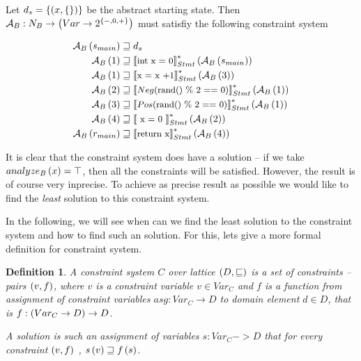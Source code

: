 \documentclass[..thesis.tex]{subfiles}
\newtheorem{defin}{Definition}[section]
\begin{document}
Let $d_s = \left\lbrace \left( x, \left\lbrace \right\rbrace \right) \right\rbrace $ be the abstract starting state. Then $\mathcal{A}_B : N_B \to \left( Var \to 2^{ \left\lbrace -, 0, + \right\rbrace } \right) $ must satisfiy the following constraint system

\begin{equation*}
  \begin{split}
    \mathcal{A}_B \left( s_{main} \right) & \sqsupseteq d_s \\
    \mathcal{A}_B \left( 1 \right) & \sqsupseteq \left\llbracket \text{\small{int x = 0}} \right\rrbracket_{Stmt}^{*} \left( \mathcal{A}_B \left( s_{main} \right) \right) \\
    \mathcal{A}_B \left( 1 \right) & \sqsupseteq \left\llbracket \text{\small{x = x +1}}  \right\rrbracket_{Stmt}^{*} \left( \mathcal{A}_B \left( 3 \right) \right) \\
    \mathcal{A}_B \left( 2 \right) & \sqsupseteq \left\llbracket  \text{\small{$Neg$(rand() \% 2 == 0)}}  \right\rrbracket_{Stmt}^{*} \left( \mathcal{A}_B \left( 1 \right) \right) \\
    \mathcal{A}_B \left( 3 \right) & \sqsupseteq \left\llbracket  \text{\small{$Pos$(rand() \% 2 == 0)}}  \right\rrbracket_{Stmt}^{*} \left( \mathcal{A}_B \left( 1 \right) \right) \\
    \mathcal{A}_B \left( 4 \right) & \sqsupseteq \left\llbracket \text{\small{ x = 0 }} \right\rrbracket_{Stmt}^{*} \left( \mathcal{A}_B \left( 2 \right) \right) \\
    \mathcal{A}_B \left( r_{main} \right)  & \sqsupseteq \left\llbracket  \text{\small{return x}}  \right\rrbracket_{Stmt}^{*} \left( \mathcal{A}_B \left( 4 \right) \right)
  \end{split} 
\end{equation*}


It is clear that the constraint system does have a solution -- if we take $analyze_B \left( x \right) = \top$, then all the constraints will be satisfied. However, the result is of course very inprecise. To achieve as precise result as possible we  would like to find the \textit{least} solution to this constraint system. 

In the following, we will see when can we find the least solution to the constraint system and how to find such an solution. For this, lets give a more formal definition for constraint system.

\begin{defin}
A \textit{constraint system} $C$ over lattice $\left( D, \sqsubseteq \right)$ is a set of \textit{constraints} -- pairs $\left( v, f \right)$, where $v$ is a constraint variable $v \in Var_C$ and $f$ is a function from assignment of constraint variables $asg: Var_C \to D$ to domain element $d \in D$, that is $f : \left( Var_C \to D \right) \to D$.

A \textit{solution} is such an assignment of variables $s : Var_C -> D$ that for every constraint $\left( v, f \right)$ , $ s \left( v \right) \sqsupseteq f \left( s \right)$. 
\end{defin}
\end{document}
